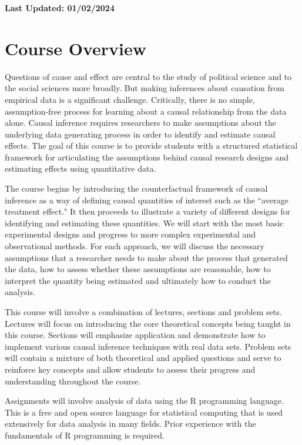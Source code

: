 \documentclass[11pt, article, oneside]{memoir}
\title{{\mytitle}}
\author{\myauthor\smallskip\footnotesize\newline Office: Pick Hall 328, 3rd floor
  \newline Office Hours: Tuesdays 4pm-6pm or schedule an appointment by e-mail \newline
    \myemail \newline \mywebsite
\newline \newline
Teaching Assistant: Zikai Li\newline
Office Hours: TBD \newline
\texttt{\href{mailto:zkl@uchicago.edu}{zkl@uchicago.edu}}
}
\date{}
\theoremstyle{Assumption}
\begin{document}
\maketitle
\textbf{Last Updated: 01/02/2024}
\section*{Course Overview}

Questions of cause and effect are central to the study of political science and to the social sciences more broadly. But making inferences about causation from empirical data is a significant challenge. Critically, there is no simple, assumption-free process for learning about a causal relationship from the data alone. Causal inference requires researchers to make assumptions about the underlying data generating process in order to identify and estimate causal effects. The goal of this course is to provide students with a structured statistical framework for articulating the assumptions behind causal research designs and estimating effects using quantitative data. 

The course begins by introducing the counterfactual framework of causal inference as a way of defining causal quantities of interest such as the ``average treatment effect." It then proceeds to illustrate a variety of different designs for identifying and estimating these quantities. We will start with the most basic experimental designs and progress to more complex experimental and observational methods. For each approach, we will discuss the necessary assumptions that a researcher needs to make about the process that generated the data, how to assess whether these assumptions are reasonable, how to interpret the quantity being estimated and ultimately how to conduct the analysis. 

This course will involve a combination of lectures, sections and problem sets. Lectures will focus on introducing the core theoretical concepts being taught in this course. Sections will emphasize application and demonstrate how to implement various causal inference techniques with real data sets. Problem sets will contain a mixture of both theoretical and applied questions and serve to reinforce key concepts and allow students to assess their progress and understanding throughout the course.

Assignments will involve analysis of data using the R programming language. This is a free and open source language for statistical computing that is used extensively for data analysis in many fields. Prior experience with the fundamentals of R programming is required.
\end{document}
